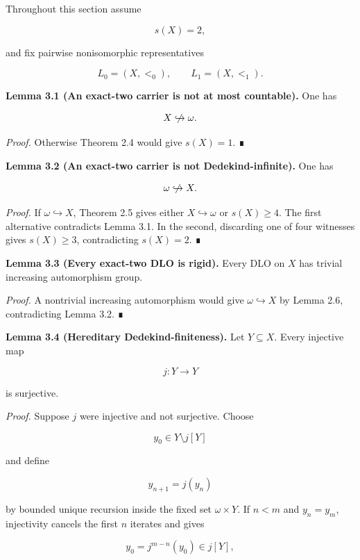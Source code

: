 \documentclass[
  english,
  11pt,
  reqno]{amsart}
\providecommand{\nhookrightarrow}{\centernot\hookrightarrow}
\begin{document}
Throughout this section assume

\[
s(X)=2,
\]

and fix pairwise nonisomorphic representatives

\[
L_0=(X,<_{0}),
\qquad
L_1=(X,<_{1}).
\]

\protect{}\label{lem:3-1-not-subcountable}

\textbf{Lemma 3.1 (An exact-two carrier is not at most countable).} One
has

\[
X\nhookrightarrow\omega.
\]

\emph{Proof.} Otherwise Theorem 2.4 would give \(s(X)=1\). ∎

\protect{}\label{lem:3-2-not-dedekind-infinite}

\textbf{Lemma 3.2 (An exact-two carrier is not Dedekind-infinite).} One
has

\[
\omega\nhookrightarrow X.
\]

\emph{Proof.} If \(\omega\hookrightarrow X\), Theorem 2.5 gives either
\(X\hookrightarrow\omega\) or \(s(X)\ge4\). The first alternative
contradicts Lemma 3.1. In the second, discarding one of four witnesses
gives \(s(X)\ge3\), contradicting \(s(X)=2\). ∎

\protect{}\label{lem:3-3-rigidity}

\textbf{Lemma 3.3 (Every exact-two DLO is rigid).} Every DLO on \(X\)
has trivial increasing automorphism group.

\emph{Proof.} A nontrivial increasing automorphism would give
\(\omega\hookrightarrow X\) by Lemma 2.6, contradicting Lemma 3.2. ∎

\protect{}\label{lem:3-4-hereditary-dedekind}

\textbf{Lemma 3.4 (Hereditary Dedekind-finiteness).} Let
\(Y\subseteq X\). Every injective map

\[
j:Y\longrightarrow Y
\]

is surjective.

\emph{Proof.} Suppose \(j\) were injective and not surjective. Choose

\[
y_0\in Y\setminus j[Y]
\]

and define

\[
y_{n+1}=j(y_n)
\]

by bounded unique recursion inside the fixed set \(\omega\times Y\). If
\(n<m\) and \(y_n=y_m\), injectivity cancels the first \(n\) iterates
and gives

\[
y_0=j^{m-n}(y_0)\in j[Y],
\]
\end{document}
